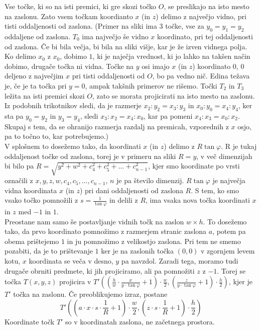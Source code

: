 \documentclass[a4paper, 12px]{article}
\begin{document}
    Vse točke, ki so na isti premici, ki gre skozi točko $O$, se preslikajo na isto mesto na zaslonu.
    Zato vsem točkam koordianto $x$ (in $z$) delimo z največjo vidno, pri tisti oddaljenosti od zaslona.
    (Primer na sliki ima 3 točke, vse za $y_0 = y_1 = y_2$ oddaljene od zaslona. $T_0$ ima največjo še vidno $x$
    koordinato, pri tej oddaljenosti od zaslona. Če bi bila večja, bi bila na sliki višje, kar je že izven vidnega polja.
    Ko delimo $x_0$ z $x_0$, dobimo $1$, ki je naječja vrednost, ki jo lahko na takšen način dobimo, drugače točka ni vidna.
    Točke na $y$ osi imajo $x$ (in $z$) koordinato $0$, $0$ deljeno z največjim $x$ pri tisti oddaljenosti od $O$, 
    bo pa vedno nič. Edina težava je, če je ta točka pri $y = 0$, ampak takšnih primerov ne rišemo.
    Točki $T_2$ in $T_3$ ležita na isti premici skozi $O$, zato se morata projicirati na isto mesto na zaslonu.
    Iz podobnih trikotnikov sledi, da je razmerje $x_2 : y_2 = x_3 : y_3$ in $x_0 : y_0 = x_4 : y_4$,
    ker sta pa $y_0 = y_2$ in $y_3 = y_4$, sledi $x_3 : x_2 = x_4 : x_0$, kar pa pomeni $x_4 : x_3 = x_0 : x_2$.
    Skupaj s tem, da se ohranijo razmerja razdalj na premicah, vzporednih z $x$ osjo, pa to točno to, kar potrebujemo.)\\

    V splošnem to dosežemo tako, da koordinati $x$ (in $z$) delimo z $R\tan{\varphi}$. R je tukaj oddaljenost točke od zaslona,
    torej je v primeru na sliki $R = y$, v več dimenzijah bi bilo pa $R = \sqrt{y^2 + w^2 + c_4^2 + c_5^2 + \dots + c_{n-1}^2}$,
    kjer smo koordinate po vrsti označili z $x, y, z, w, c_4, c_5, \dots, c_{n-1}$, $n$ je pa število dimenzij.
    $R\tan{\varphi}$ je največja vidna koordinata $x$ (in $z$) pri dani oddaljenosti od zaslona $R$.
    S tem, ko smo vsako točko pomnožili z $s = \frac{1}{\tan{\varphi}}$ in delili z $R$, ima vsaka nova točka koordinati $x$ in $z$ med $-1$ in $1$. \\

    Preostane nam samo še postavljanje vidnih točk na zaslon $w \times h$. To dosežemo tako, da prvo koordinato pomnožimo
    z razmerjem stranic zaslona $a$, potem pa obema prištejemo $1$ in ju pomnožimo z velikostjo zaslona. Pri tem ne smemo
    pozabiti, da je to prištevanje $1$ ker je na zaslonih točka $\left(0, 0\right)$ v zgornjem levem kotu, $x$ koordinata
    se veča v desno, $y$ pa navzdol. Zaradi tega, moramo tudi drugače obrniti predmete, ki jih projiciramo, ali pa pomnožiti
    $z$ z $-1$. Torej se točka $T\left(x, y, z\right)$ projicira v 
    $T'\left(\left(\frac{h}{w} \cdot \frac{x}{y \cdot \tan{\varphi}} + 1\right) \cdot \frac{w}{2},
    \left(\frac{z}{y \cdot \tan{\varphi}} + 1\right) \cdot \frac{h}{2} \right)$, 
    kjer je $T'$ točka na zaslonu. Če preoblikujemo izraz, postane 
    $$T'\left(\left(a \cdot x \cdot s \cdot \frac{1}{R} + 1\right) \cdot \frac{w}{2},
    \left(z \cdot s \cdot \frac{1}{R} + 1\right) \cdot \frac{h}{2} \right)$$
    Koordinate točk $T'$ so v koordinatah zaslona, ne začetnega prostora.
    \cite{ProjectionVideo}
\end{document}
